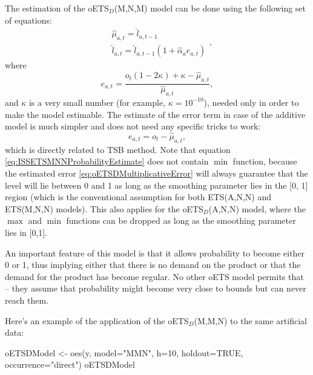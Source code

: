 \documentclass[
]{book}
\newenvironment{Shaded}{\begin{snugshade}}{\end{snugshade}}
\newcommand{\AttributeTok}[1]{\textcolor[rgb]{0.77,0.63,0.00}{#1}}
\newcommand{\ConstantTok}[1]{\textcolor[rgb]{0.00,0.00,0.00}{#1}}
\newcommand{\DecValTok}[1]{\textcolor[rgb]{0.00,0.00,0.81}{#1}}
\newcommand{\FunctionTok}[1]{\textcolor[rgb]{0.00,0.00,0.00}{#1}}
\newcommand{\NormalTok}[1]{#1}
\newcommand{\OtherTok}[1]{\textcolor[rgb]{0.56,0.35,0.01}{#1}}
\newcommand{\StringTok}[1]{\textcolor[rgb]{0.31,0.60,0.02}{#1}}
\theoremstyle{definition}
\theoremstyle{definition}
\theoremstyle{definition}
\theoremstyle{definition}
\theoremstyle{remark}
\begin{document}
The estimation of the oETS\(_D\)(M,N,M) model can be done using the following set of equations:
\begin{equation}
\begin{aligned}
& \hat{\mu}_{a,t} = \hat{l}_{a,t-1} \\
& \hat{l}_{a,t} = \hat{l}_{a,t-1}( 1  + \hat{\alpha}_{a} e_{a,t})
\end{aligned},
\label{eq:ISSETSMNNProbabilityEstimate}
\end{equation}
where
\begin{equation}
e_{a,t} = \frac{o_t (1 -2 \kappa) + \kappa -\hat{\mu}_{a,t}}{\hat{\mu}_{a,t}},
\label{eq:oETSDMultiplicativeError}
\end{equation}
and \(\kappa\) is a very small number (for example, \(\kappa = 10^{-10}\)), needed only in order to make the model estimable. The estimate of the error term in case of the additive model is much simpler and does not need any specific tricks to work:
\begin{equation}
e_{a,t} = o_t -\hat{\mu}_{a,t} ,
\label{eq:oETSDAdditiveError}
\end{equation}
which is directly related to TSB method. Note that equation \eqref{eq:ISSETSMNNProbabilityEstimate} does not contain \(\min\) function, because the estimated error \eqref{eq:oETSDMultiplicativeError} will always guarantee that the level will lie between 0 and 1 as long as the smoothing parameter lies in the {[}0, 1{]} region (which is the conventional assumption for both ETS(A,N,N) and ETS(M,N,N) models). This also applies for the oETS\(_D\)(A,N,N) model, where the \(\max\) and \(\min\) functions can be dropped as long as the smoothing parameter lies in {[}0,1{]}.

An important feature of this model is that it allows probability to become either 0 or 1, thus implying either that there is no demand on the product or that the demand for the product has become regular. No other oETS model permits that -- they assume that probability might become very close to bounds but can never reach them.

Here's an example of the application of the oETS\(_D\)(M,M,N) to the same artificial data:

\begin{Shaded}
\begin{Highlighting}[]
\NormalTok{oETSDModel }\OtherTok{\textless{}{-}} \FunctionTok{oes}\NormalTok{(y, }\AttributeTok{model=}\StringTok{"MMN"}\NormalTok{, }\AttributeTok{h=}\DecValTok{10}\NormalTok{, }\AttributeTok{holdout=}\ConstantTok{TRUE}\NormalTok{,}
                  \AttributeTok{occurrence=}\StringTok{"direct"}\NormalTok{)}
\NormalTok{oETSDModel}
\end{Highlighting}
\end{Shaded}
\end{document}
